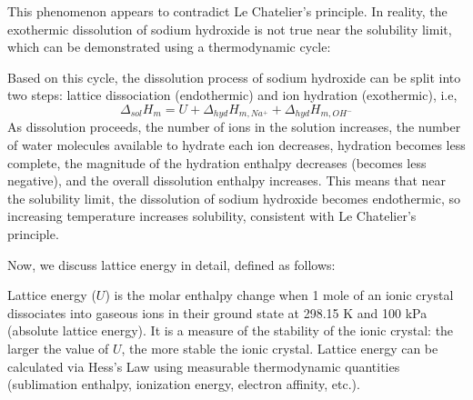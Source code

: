 This phenomenon appears to contradict Le Chatelier's principle. In reality, the exothermic dissolution of sodium hydroxide is not true near the solubility limit, which can be demonstrated using a thermodynamic cycle:

\begin{center}
\end{center}

Based on this cycle, the dissolution process of sodium hydroxide can be split into two steps: lattice dissociation (endothermic) and ion hydration (exothermic), i.e,
$$\Delta_{sol} H_m = U  +  \Delta_{hyd} H_{m, Na^+} + \Delta_{hyd} H_{m, OH^-}$$
As dissolution proceeds, the number of ions in the solution increases, the number of water molecules available to hydrate each ion decreases, hydration becomes less complete, the magnitude of the hydration enthalpy decreases (becomes less negative), and the overall dissolution enthalpy increases. This means that near the solubility limit, the dissolution of sodium hydroxide becomes endothermic, so increasing temperature increases solubility, consistent with Le Chatelier's principle.

Now, we discuss lattice energy in detail, defined as follows:

\begin{definition}
Lattice energy ($U$) is the molar enthalpy change when 1 mole of an ionic crystal dissociates into gaseous ions in their ground state at 298.15 K and 100 kPa (absolute lattice energy). It is a measure of the stability of the ionic crystal: the larger the value of $U$, the more stable the ionic crystal. Lattice energy can be calculated via Hess's Law using measurable thermodynamic quantities (sublimation enthalpy, ionization energy, electron affinity, etc.).
\end{definition}

